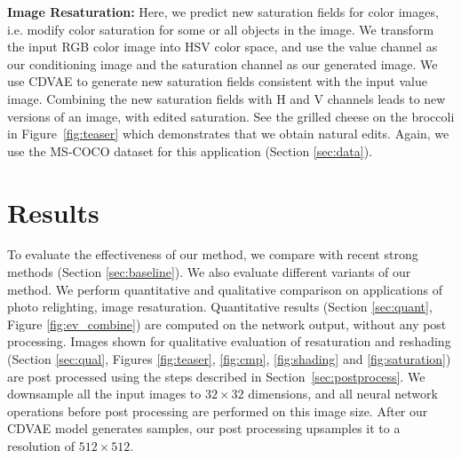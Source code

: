 \documentclass[10pt,twocolumn,letterpaper]{article}
\begin{document}

{\bf Image Resaturation:} Here, we predict new saturation fields for color images, i.e.\we 
modify color saturation for some or all objects in the image.  We transform the input RGB color image into 
HSV color space, and use the value channel as our conditioning image and the saturation channel as our 
generated image.  We use CDVAE to generate new saturation fields consistent with the input value image. 
Combining the new saturation fields with H and V channels leads to new versions of an image, 
with edited saturation. See the grilled cheese on the broccoli in Figure~\ref{fig:teaser} which demonstrates
that we obtain natural edits. Again, we use the MS-COCO dataset for this application (Section \ref{sec:data}).

\section{Results}
\label{sec:result}
To evaluate the effectiveness of our method, we compare with recent strong methods (Section \ref{sec:baseline}). 
We also evaluate different variants of our method. We perform quantitative and qualitative comparison on 
applications of photo relighting, image resaturation. Quantitative results (Section \ref{sec:quant}, Figure \ref{fig:ev_combine}) are 
computed on the network output, without any post processing.  Images shown for qualitative evaluation of 
resaturation and reshading (Section \ref{sec:qual}, Figures \ref{fig:teaser}, \ref{fig:cmp}, \ref{fig:shading} and \ref{fig:saturation}) 
are post processed using the steps described in Section~\ref{sec:postprocess}. We downsample all the 
input images to $32 \times 32$ dimensions, and all neural network operations before post processing are 
performed on this image size. After our CDVAE model generates samples, our post processing upsamples 
it to a resolution of $512 \times 512$. 
\end{document}
